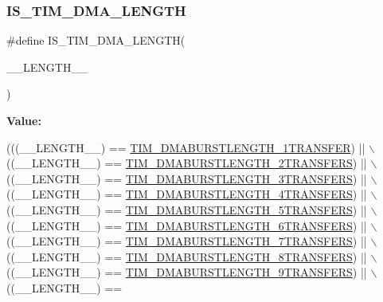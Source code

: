 \subsubsection{\texorpdfstring{I\+S\+\_\+\+T\+I\+M\+\_\+\+D\+M\+A\+\_\+\+L\+E\+N\+G\+TH}{IS\_TIM\_DMA\_LENGTH}}
{\footnotesize\ttfamily \#define I\+S\+\_\+\+T\+I\+M\+\_\+\+D\+M\+A\+\_\+\+L\+E\+N\+G\+TH(\begin{DoxyParamCaption}\item[{}]{\+\_\+\+\_\+\+L\+E\+N\+G\+T\+H\+\_\+\+\_\+ }\end{DoxyParamCaption})}

{\bfseries Value\+:}
\begin{DoxyCode}
(((\_\_LENGTH\_\_) == \hyperlink{group___t_i_m___d_m_a___burst___length_ga74f07b4a10022d71f31ec6e1b2b69276}{TIM\_DMABURSTLENGTH\_1TRANSFER}) || \(\backslash\)
                                            ((\_\_LENGTH\_\_) == 
      \hyperlink{group___t_i_m___d_m_a___burst___length_gab114592091a00e0a6b9ae464485bd7bb}{TIM\_DMABURSTLENGTH\_2TRANSFERS}) || \(\backslash\)
                                            ((\_\_LENGTH\_\_) == 
      \hyperlink{group___t_i_m___d_m_a___burst___length_gad91c14f0930803593ecdbd98002fea0a}{TIM\_DMABURSTLENGTH\_3TRANSFERS}) || \(\backslash\)
                                            ((\_\_LENGTH\_\_) == 
      \hyperlink{group___t_i_m___d_m_a___burst___length_ga9ada9605ae6ff6e4ada9701263bef812}{TIM\_DMABURSTLENGTH\_4TRANSFERS}) || \(\backslash\)
                                            ((\_\_LENGTH\_\_) == 
      \hyperlink{group___t_i_m___d_m_a___burst___length_ga740a6446c0a517cc3e235fddee45fef5}{TIM\_DMABURSTLENGTH\_5TRANSFERS}) || \(\backslash\)
                                            ((\_\_LENGTH\_\_) == 
      \hyperlink{group___t_i_m___d_m_a___burst___length_ga905c206d2a028e3fb92bcab8f9f7c869}{TIM\_DMABURSTLENGTH\_6TRANSFERS}) || \(\backslash\)
                                            ((\_\_LENGTH\_\_) == 
      \hyperlink{group___t_i_m___d_m_a___burst___length_gae75055ac13b73baf9326f1d6157853a7}{TIM\_DMABURSTLENGTH\_7TRANSFERS}) || \(\backslash\)
                                            ((\_\_LENGTH\_\_) == 
      \hyperlink{group___t_i_m___d_m_a___burst___length_gac6b24f5b7d9e1968b4bfcaeb24e718fc}{TIM\_DMABURSTLENGTH\_8TRANSFERS}) || \(\backslash\)
                                            ((\_\_LENGTH\_\_) == 
      \hyperlink{group___t_i_m___d_m_a___burst___length_ga73fff75a3f0247c61a84a42e8cb83572}{TIM\_DMABURSTLENGTH\_9TRANSFERS}) || \(\backslash\)
                                            ((\_\_LENGTH\_\_) == 

\end{DoxyCode}
